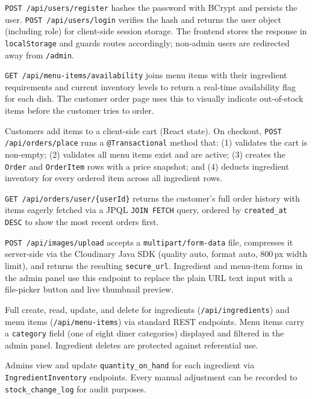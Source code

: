 \documentclass[12pt,a4paper]{article}
\begin{document}
\begin{description}[style=nextline]
    \item[User registration and authentication]
    \texttt{POST /api/users/register} hashes the password with BCrypt and
    persists the user. \texttt{POST /api/users/login} verifies the hash and
    returns the user object (including role) for client-side session storage.
    The frontend stores the response in \texttt{localStorage} and guards
    routes accordingly; non-admin users are redirected away from
    \texttt{/admin}.

    \item[Menu browsing and availability]
    \texttt{GET /api/menu-items/availability} joins menu items with their
    ingredient requirements and current inventory levels to return a real-time
    availability flag for each dish. The customer order page uses this to
    visually indicate out-of-stock items before the customer tries to order.

    \item[Cart and order placement]
    Customers add items to a client-side cart (React state). On checkout,
    \texttt{POST /api/orders/place} runs a \texttt{@Transactional} method that:
    (1) validates the cart is non-empty;
    (2) validates all menu items exist and are active;
    (3) creates the \texttt{Order} and \texttt{OrderItem} rows with a price
    snapshot; and
    (4) deducts ingredient inventory for every ordered item across all
    ingredient rows.

    \item[Order history]
    \texttt{GET /api/orders/user/\{userId\}} returns the customer's full order
    history with items eagerly fetched via a JPQL \texttt{JOIN FETCH} query,
    ordered by \texttt{created\_at DESC} to show the most recent orders first.

    \item[Image upload]
    \texttt{POST /api/images/upload} accepts a \texttt{multipart/form-data}
    file, compresses it server-side via the Cloudinary Java SDK
    (quality auto, format auto, 800\,px width limit), and returns the
    resulting \texttt{secure\_url}. Ingredient and menu-item forms in the admin
    panel use this endpoint to replace the plain URL text input with a
    file-picker button and live thumbnail preview.

    \item[Ingredient and menu item CRUD]
    Full create, read, update, and delete for ingredients (\texttt{/api/ingredients})
    and menu items (\texttt{/api/menu-items}) via standard REST endpoints.
    Menu items carry a \texttt{category} field (one of eight diner categories)
    displayed and filtered in the admin panel.
    Ingredient deletes are protected against referential use.

    \item[Inventory management]
    Admins view and update \texttt{quantity\_on\_hand} for each ingredient via
    \texttt{IngredientInventory} endpoints. Every manual adjustment can be
    recorded to \texttt{stock\_change\_log} for audit purposes.
\end{description}
\end{document}
